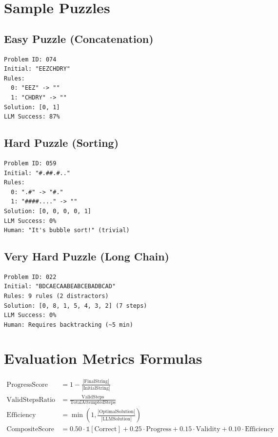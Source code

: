 \documentclass[11pt,a4paper]{article}
\begin{document}
\appendix
\section{Sample Puzzles}

\subsection{Easy Puzzle (Concatenation)}
\begin{lstlisting}
Problem ID: 074
Initial: "EEZCHDRY"
Rules:
  0: "EEZ" -> ""
  1: "CHDRY" -> ""
Solution: [0, 1]
LLM Success: 87%
\end{lstlisting}

\subsection{Hard Puzzle (Sorting)}
\begin{lstlisting}
Problem ID: 059
Initial: "#.##.#.."
Rules:
  0: ".#" -> "#."
  1: "####...." -> ""
Solution: [0, 0, 0, 0, 1]
LLM Success: 0%
Human: "It's bubble sort!" (trivial)
\end{lstlisting}

\subsection{Very Hard Puzzle (Long Chain)}
\begin{lstlisting}
Problem ID: 022
Initial: "BDCAECAABEABCEBADBCAD"
Rules: 9 rules (2 distractors)
Solution: [0, 8, 1, 5, 4, 3, 2] (7 steps)
LLM Success: 0%
Human: Requires backtracking (~5 min)
\end{lstlisting}

\section{Evaluation Metrics Formulas}

\begin{align}
\text{ProgressScore} &= 1 - \frac{|\text{FinalString}|}{|\text{InitialString}|} \\[0.5em]
\text{ValidStepsRatio} &= \frac{\text{ValidSteps}}{\text{TotalAttemptedSteps}} \\[0.5em]
\text{Efficiency} &= \min\left(1, \frac{|\text{OptimalSolution}|}{|\text{LLMSolution}|}\right) \\[0.5em]
\text{CompositeScore} &= 0.50 \cdot \mathbb{1}[\text{Correct}] + 0.25 \cdot \text{Progress} + 0.15 \cdot \text{Validity} + 0.10 \cdot \text{Efficiency}
\end{align}
\end{document}
